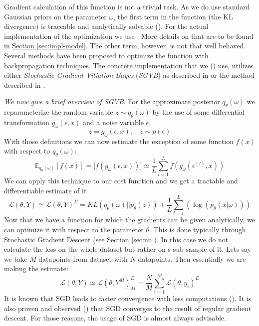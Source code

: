 \documentclass[12pt,a4paper,twoside]{scrartcl}
\numberwithin{equation}{section}
\newcommand{\refsec}[1]{\hyperref[#1]{Section \ref*{#1}}}
\begin{document}
Gradient calculation of this function is not a trivial task. As we do use standard Gaussian priors on the parameter \(\omega\), the first term in the function (the KL divergence) is traceable and analytically solvable (\cite{paisley2012}). For the actual implementation of the optimization we use \cite{tf}. More details on that are to be found in \refsec{sec:impl-model}. The other term, however, is not that well behaved. Several methods have been proposed to optimize the function with backpropagation techniques. The concrete implementation that we (\cite{edward}) use, utilizes either \emph{Stochastic Gradient Vitiation Bayes} (\emph{SGVB}) as described in \cite{kingma2013} or the method described in \cite{paisley2012}. 

\emph{We now give a brief overview of SGVB}. For the approximate posterior \(q_{\theta}(\omega)\) we reparameterize the random variable \(z \sim q_{\theta}(\omega)\) by the use of some differential transformation \(g_{\omega}(\epsilon , x)\) and a noise variable \(\epsilon\).
\begin{equation}
  z =  g_{\omega}(\epsilon , x), \quad \epsilon \sim p(\epsilon)
\end{equation}
With those definitions we can now estimate the exception of some function \(f(x)\) with respect to \(q_{\theta}(\omega)\):
\begin{equation}
  \mathbb{E}_{q_{\theta}(\omega)}[f(x)] = \mathbb[f(g_{\omega}(\epsilon , x))] \simeq \frac{1}{L}\sum_{l=1}^L f(g_{\omega}(\epsilon^{(l)} , x))
\end{equation}
We can apply this technique to our cost function and we get a tractable and differentiable estimate of it
\begin{equation}
  \mathcal{L}(\theta, Y) \simeq \mathcal{L}(\theta,Y)^E = KL(q_{\theta}(\omega)||p_{\theta}(z))  + \frac{1}{L}\sum_{l=1}^L(\log(p_{\theta}(x|\omega)))
\end{equation}
Now that we have a function for which the gradients can be given analytically, we can optimize it with respect to the parameter \(\theta\). This is done typically through Stochastic Gradient Descent (see \refsec{sec:nn}). In this case we do not calculate the loss on the whole dataset but rather on s sub-sample of it. Lets say we take \(M\) datapoints from dataset with \(N\) datapoints. Then essentially we are making the estimate:
\begin{equation}
  \mathcal{L}(\theta, Y) \simeq \mathcal{L}(\theta, Y^M)^E_M = \frac{N}{M}  \sum_{i=1}^{M}\mathcal{L}(\theta, y_i)^E
\end{equation}
It is known that SGD leads to faster convergence with less computations (\cite{robbins1951}). It is also proven and observed (\cite{shapiro1996}) that SGD converges to the result of regular gradient descent. For those reasons, the usage of SGD is almost always advisable.
\end{document}
